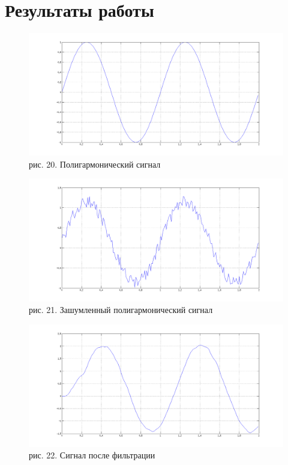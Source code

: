 \documentclass[10pt,a4paper]{report}
\begin{document}
\section{Результаты работы}
\begin{figure}
\begin{center}
\includegraphics[width=150mm, scale = 0.9]{6_1.png}\newline
рис. 20. Полигармонический сигнал\newline
\end{center}
\end{figure}
\begin{figure}
\begin{center}
\includegraphics[width=150mm, scale = 0.9]{6_2.png}\newline
рис. 21. Зашумленный полигармонический сигнал\newline
\end{center}
\end{figure}
\begin{figure}
\begin{center}
\includegraphics[width=150mm, scale = 0.9]{6_3.png}\newline
рис. 22. Сигнал после фильтрации\newline
\end{center}
\end{figure}
\end{document}
